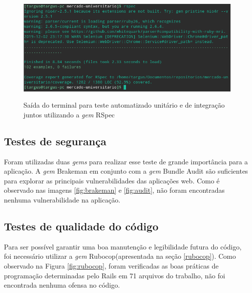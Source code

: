 \begin{figure}[htbp!]
  \centering
  \caption{Saída do terminal para teste automatizado unitário e de integração juntos utilizando a \textit{gem} RSpec}
  \includegraphics[width=1\textwidth]{figs/rspec.png}
    \label{fig:rspec}
\end{figure}


\subsection{Testes de segurança}

Foram utilizadas duas \textit{gems} para realizar esse teste de grande importância para a aplicação. A \textit{gem} Brakeman em conjunto com a \textit{gem} Bundle Audit são suficientes para explorar as principais vulnerabilidades das aplicações web. Como é observado nas imagens \ref{fig:brakeman} e \ref{fig:audit}, não foram encontradas nenhuma vulnerabilidade na aplicação.


\subsection{Testes de qualidade do código}

Para ser possível garantir uma boa manutenção e legibilidade futura do código, foi necessário utilizar a \textit{gem} Rubocop(apresentada na seção \ref{rubocop}). Como observado na Figura \ref{fig:rubocop}, foram verificadas as boas práticas de programação determinadas pelo Rails em 71 arquivos do trabalho, não foi encontrada nenhuma ofensa no código.

